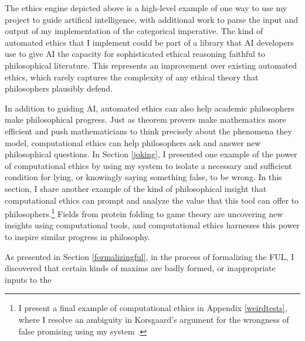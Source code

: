 \begin{isabellebody}
\begin{isamarkuptext}
The ethics engine depicted above is a high-level example of one way to use my project to guide artifical intelligence,
with additional work to parse the input and output of my implementation of the categorical imperative.
The kind of automated ethics that I implement could be part of a library that AI developers use to 
give AI the capacity for sophisticated ethical reasoning faithful to philosophical literature. 
This represents an improvement over existing automated ethics, which rarely captures the complexity 
of any ethical theory that philosophers plausibly defend.%
\end{isamarkuptext}\isamarkuptrue%
%
\isadelimdocument
%
\endisadelimdocument
%
\isatagdocument
%
\isamarkuptrue%
%
\endisatagdocument
{\isafolddocument}%
%
\isadelimdocument
%
\endisadelimdocument
%
\begin{isamarkuptext}%
In addition to guiding AI, automated ethics can also help academic philosophers make philosophical
progress. Just as theorem provers make mathematics more efficient and push mathematicians to think 
precisely about the phenomena they model, computational ethics can help philosophers ask and answer
new philosophical questions. In Section \ref{joking}, I presented one example of the power of computational ethics
by using my system to isolate a necessary and sufficient condition for lying, or knowingly saying
something false, to be wrong. In this section, I share another example of the kind of philosophical 
insight that computational ethics can prompt and analyze the value that this tool can offer to philosophers.\footnote{
I present a final example of computational ethics in Appendix \ref{weirdtests}, where I resolve an ambiguity 
in Korsgaard's argument for the wrongness of false promising using my system \citep{KorsgaardFUL}.} 
Fields from protein folding to game theory are uncovering new insights using computational tools, and computational
ethics harnesses this power to inspire similar progress in philosophy.%
\end{isamarkuptext}\isamarkuptrue%
%
\isadelimdocument
%
\endisadelimdocument
%
\isatagdocument
%
\isamarkuptrue%
%
\endisatagdocument
{\isafolddocument}%
%
\isadelimdocument
%
\endisadelimdocument
%
\begin{isamarkuptext}%
As presented in Section \ref{formalizingful}, in the process of formalizing
the FUL, I discovered that certain kinds of maxims are badly formed, or inappropriate inputs to the 

\end{isamarkuptext}
\end{isabellebody}
